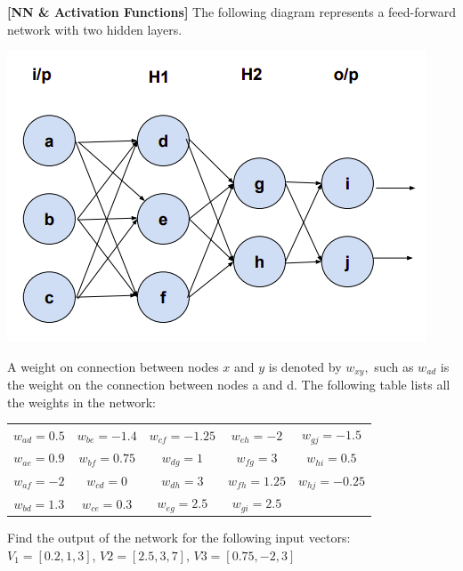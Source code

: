 \documentclass[addpoints,12pt,solution]{exam}
\begin{document}
\begin{questions}
\question[2] \textbf{[NN \& Activation Functions]} The following diagram represents a feed-forward network with two hidden layers. \\
\begin{center}
        \includegraphics[scale=0.5]{NN.png}
\end{center}

A weight on connection between nodes $x$ and $y$ is denoted by $w_{xy},$ such as $w_{ad}$ is the weight on the connection between nodes a and d. The following table lists all the weights in the network: \\ 

\begin{center}
\begin{tabular}{|c|c|c|c|c |}
     $w_{ad} = 0.5$ & $w_{be} = -1.4$ & $w_{cf} = -1.25$ & $w_{eh} = -2$ & $w_{gj } = -1.5$\\
     $w_{ae} = 0.9 $ & $w_{bf} = 0.75$ & $w_{dg} = 1$ & $w_{fg} = 3$ & $w_{hi } = 0.5$\\
     $w_{af} = -2$ & $w_{cd} = 0$ & $w_{dh} = 3$ & $w_{fh} = 1.25$ & $w_{hj } = -0.25$\\
     $w_{bd} = 1.3$ & $w_{ce} = 0.3$ & $w_{eg} = 2.5$ & $w_{gi } = 2.5$& \\
\end{tabular}
\end{center}

Find the output of the network for the following input vectors: \\
$V_1 = [0.2, 1, 3]$, $V2 = [2.5, 3, 7]$, $V3 = [0.75, -2, 3]$

\end{questions}
\end{document}
